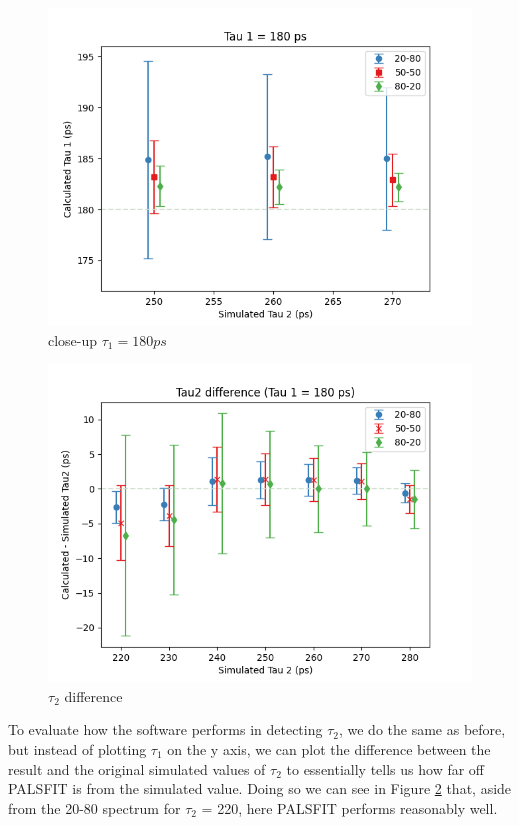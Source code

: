 \begin{figure}
    \centering
    \includegraphics[width=0.8\linewidth]{Batch 1+2/Tau1 stragglers.png}
    \caption{close-up $\tau_1 = 180ps$}
    \label{fig:180-tau1-zoomed}
\end{figure}

\begin{figure}
    \centering
    \includegraphics[width=0.8\linewidth]{Batch 1+2/Tau2 diff.png}
    \caption{$\tau_2$ difference}
    \label{fig:180-tau2}
\end{figure}

To evaluate how the software performs in detecting $\tau_2$, we do the same as before, but instead of plotting $\tau_1$ on the y axis, we can plot the difference between the result and the original simulated values of $\tau_2$ to essentially tells us how far off PALSFIT is from the simulated value. Doing so we can see in Figure \ref{fig:180-tau2} that, aside from the 20-80 spectrum for $\tau_2$ = 220, here PALSFIT performs reasonably well.

